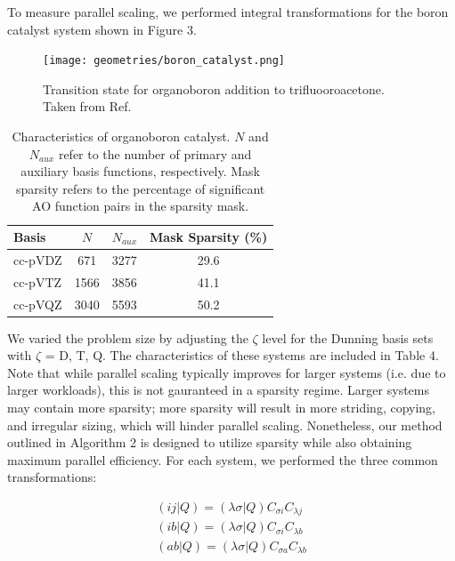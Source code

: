 To measure parallel scaling, we performed integral transformations for the boron catalyst system shown in Figure 3. 

\begin{figure} 
\centering
\texttt{[image: geometries/boron\_catalyst.png]} \caption{Transition state for organoboron addition to trifluooroacetone. Taken from Ref. \cite{Lec:2016:768}} 
\label{fig:databases} \end{figure}

\begingroup
\begin{table}[H]
\centering
\renewcommand{\baselinestretch}{1}
\caption{Characteristics of organoboron catalyst.
$N$ and $N_{aux}$ refer to the number of primary and auxiliary basis functions, respectively.
Mask sparsity refers to the percentage of significant AO function pairs in the sparsity mask.}
\begin{tabular}{l ccc}
\multicolumn{1}{l}{\textbf{Basis}} &
\multicolumn{1}{c}{\textbf{$N$}} &
\multicolumn{1}{c}{\textbf{$N_{aux}$}} &
\multicolumn{1}{c}{\textbf{Mask Sparsity (\%)}} \\
\hline
cc-pVDZ   & 671  & 3277 & 29.6 \\          
cc-pVTZ   & 1566 & 3856 & 41.1 \\          
cc-pVQZ   & 3040 & 5593 & 50.2 \\          
\end{tabular}
\end{table}
\endgroup

\noindent We varied the problem size by adjusting the $\zeta$ level for the Dunning basis sets with $\zeta$ = D, T, Q.
The characteristics of these systems are included in Table 4. Note that while parallel scaling typically improves
for larger systems (i.e. due to larger workloads),
this is not gauranteed in a sparsity regime. Larger systems may contain more sparsity;
more sparsity will result in more striding, copying, and irregular sizing,
which will hinder parallel scaling. Nonetheless, our method outlined in Algorithm 2 is designed to utilize sparsity while also
obtaining maximum parallel efficiency. For each system, we performed the three common transformations:

\begin{align} 
(i j | Q) = (\lambda \sigma | Q) C_{\sigma i} C_{\lambda j} \\
(i b | Q) = (\lambda \sigma | Q) C_{\sigma i} C_{\lambda b} \\
(a b | Q) = (\lambda \sigma | Q) C_{\sigma a} C_{\lambda b} 
\end{align}

